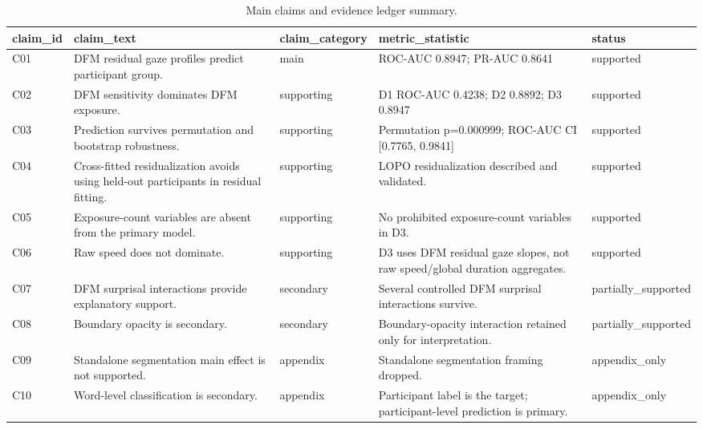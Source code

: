 \begin{table}[t]
\centering
\small
\caption{Main claims and evidence ledger summary.}
\label{tab:claims-evidence}
\begin{tabular}{lllll}
\toprule
claim\_id & claim\_text & claim\_category & metric\_statistic & status \\
\midrule
C01 & DFM residual gaze profiles predict participant group. & main & ROC-AUC 0.8947; PR-AUC 0.8641 & supported \\
C02 & DFM sensitivity dominates DFM exposure. & supporting & D1 ROC-AUC 0.4238; D2 0.8892; D3 0.8947 & supported \\
C03 & Prediction survives permutation and bootstrap robustness. & supporting & Permutation p=0.000999; ROC-AUC CI [0.7765, 0.9841] & supported \\
C04 & Cross-fitted residualization avoids using held-out participants in residual fitting. & supporting & LOPO residualization described and validated. & supported \\
C05 & Exposure-count variables are absent from the primary model. & supporting & No prohibited exposure-count variables in D3. & supported \\
C06 & Raw speed does not dominate. & supporting & D3 uses DFM residual gaze slopes, not raw speed/global duration aggregates. & supported \\
C07 & DFM surprisal interactions provide explanatory support. & secondary & Several controlled DFM surprisal interactions survive. & partially\_supported \\
C08 & Boundary opacity is secondary. & secondary & Boundary-opacity interaction retained only for interpretation. & partially\_supported \\
C09 & Standalone segmentation main effect is not supported. & appendix & Standalone segmentation framing dropped. & appendix\_only \\
C10 & Word-level classification is secondary. & appendix & Participant label is the target; participant-level prediction is primary. & appendix\_only \\
\bottomrule
\end{tabular}
\end{table}
